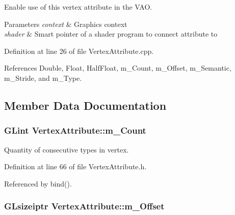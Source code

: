 Enable use of this vertex attribute in the V\+AO. 


\begin{DoxyParams}{Parameters}
{\em context} & Graphics context \\
\hline
{\em shader} & Smart pointer of a shader program to connect attribute to \\
\hline
\end{DoxyParams}


Definition at line 26 of file Vertex\+Attribute.\+cpp.



References Double, Float, Half\+Float, m\+\_\+\+Count, m\+\_\+\+Offset, m\+\_\+\+Semantic, m\+\_\+\+Stride, and m\+\_\+\+Type.



\subsection{Member Data Documentation}
\subsubsection[{\texorpdfstring{m\+\_\+\+Count}{m_Count}}]{\setlength{\rightskip}{0pt plus 5cm}G\+Lint Vertex\+Attribute\+::m\+\_\+\+Count\hspace{0.3cm}{\ttfamily [private]}}\hypertarget{class_vertex_attribute_a3152574c68d7bede1302f6ec6f78b065}{}\label{class_vertex_attribute_a3152574c68d7bede1302f6ec6f78b065}


Quantity of consecutive types in vertex. 



Definition at line 66 of file Vertex\+Attribute.\+h.



Referenced by bind().

\subsubsection[{\texorpdfstring{m\+\_\+\+Offset}{m_Offset}}]{\setlength{\rightskip}{0pt plus 5cm}G\+Lsizeiptr Vertex\+Attribute\+::m\+\_\+\+Offset\hspace{0.3cm}{\ttfamily [private]}}\hypertarget{class_vertex_attribute_af9c032cbe6af149b1e43f7e470aa9078}{}\label{class_vertex_attribute_af9c032cbe6af149b1e43f7e470aa9078}


